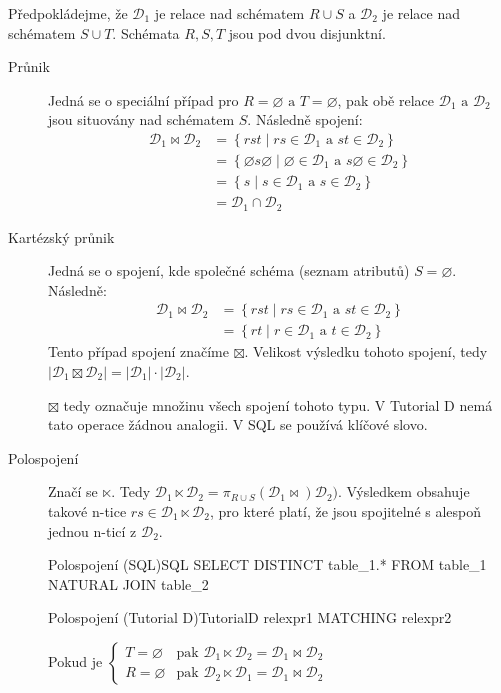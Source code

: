 Předpokládejme, že $\mathcal{D}_{1}$ je relace nad schématem $R \cup S$ a $\mathcal{D}_{2}$ je relace nad schématem $S \cup T$. Schémata $R, S, T$ jsou pod dvou disjunktní. 
\begin{description}
\item[Průnik] Jedná se o speciální případ pro $R = \varnothing \text{ a } T = \varnothing$, pak obě relace $\mathcal{D}_{1} \text{ a } \mathcal{D}_{2}$ jsou situovány nad schématem $S$. Následně spojení:
\begin{align*}
\mathcal{D}_{1} \Join \mathcal{D}_{2} &= \left\{ rst \; | \; rs \in \mathcal{D}_{1} \text{ a } st \in \mathcal{D}_{2} \right\} \\
&= \left\{ \varnothing s \varnothing \; | \; \varnothing \in \mathcal{D}_{1} \text{ a } s \varnothing \in \mathcal{D}_{2} \right\} \\
&= \left\{ s \; | \; s \in \mathcal{D}_{1} \text{ a } s \in \mathcal{D}_{2} \right\} \\
&= \mathcal{D}_{1} \cap \mathcal{D}_{2}
\end{align*}

\item[Kartézský průnik] Jedná se o spojení, kde společné schéma (seznam atributů) $S = \varnothing$. Následně:
\begin{align*}
\mathcal{D}_{1} \Join \mathcal{D}_{2} &= \left\{ rst \; | \; rs \in \mathcal{D}_{1} \text{ a } st \in \mathcal{D}_{2} \right\} \\
&= \left\{ rt \; | \; r \in \mathcal{D}_{1} \text{ a } t \in \mathcal{D}_{2} \right\}
\end{align*}
Tento případ spojení značíme $\boxtimes$. Velikost výsledku tohoto spojení, tedy $\left| \mathcal{D}_{1} \boxtimes \mathcal{D}_{2} \right| = \left|\mathcal{D}_{1}\right| \cdot \left|\mathcal{D}_{2}\right|$.

$\boxtimes$ tedy označuje množinu všech spojení tohoto typu. V Tutorial D nemá tato operace žádnou analogii. V SQL se používá klíčové slovo.

\item[Polospojení] Značí se $\ltimes$. Tedy $\mathcal{D}_{1} \ltimes \mathcal{D}_{2} = \pi_{R \cup S} (\mathcal{D}_{1} \Join) \mathcal{D}_{2})$. Výsledkem obsahuje takové n-tice $rs \in \mathcal{D}_{1} \ltimes \mathcal{D}_{2}$, pro které platí, že jsou spojitelné s alespoň jednou n-ticí z $\mathcal{D}_{2}$.
\begin{upcode}{Polospojení (SQL)}{}{SQL}
SELECT DISTINCT table_1.* FROM table_1 NATURAL JOIN table_2
\end{upcode}
\begin{upcode}{Polospojení (Tutorial D)}{}{TutorialD}
relexpr1 MATCHING relexpr2
\end{upcode}
Pokud je $\left\{\!\!\!
\begin{array}{ll}
T = \varnothing & \text{pak } \mathcal{D}_{1} \ltimes \mathcal{D}_{2} = \mathcal{D}_{1} \Join \mathcal{D}_{2} \\
R = \varnothing & \text{pak } \mathcal{D}_{2} \ltimes \mathcal{D}_{1} = \mathcal{D}_{1} \Join \mathcal{D}_{2}
\end{array}\right.$


\end{description}
